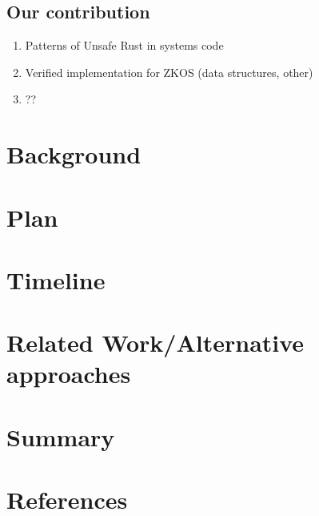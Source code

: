 \documentclass{article}
\begin{document}
\subsection{Our contribution}
\begin{enumerate}
    \item Patterns of Unsafe Rust in systems code
    \item Verified implementation for ZKOS (data structures, other)
    \item ??
\end{enumerate}

\section{Background}

\section{Plan}

\section{Timeline}

\section{Related Work/Alternative approaches}

\section{Summary}

\section{References}
\end{document}
